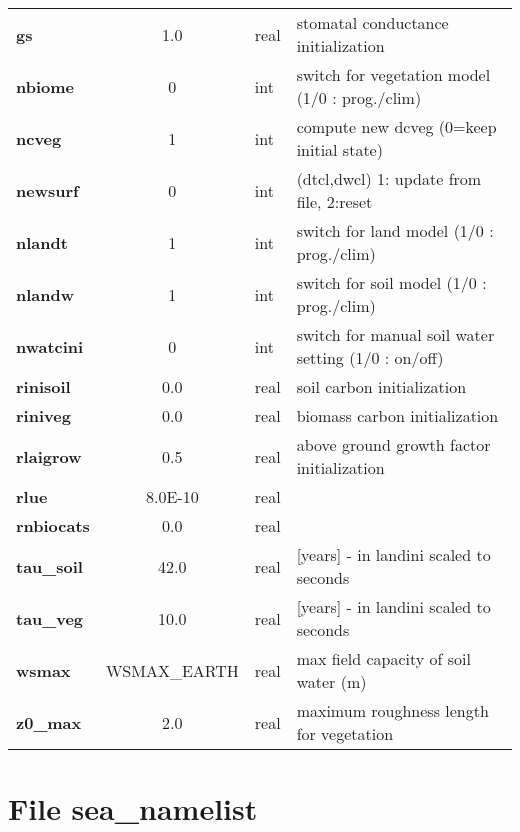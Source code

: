 \begin{tabular}{|l|c|l|l|}
{\bf  gs       } & 1.0   & real & stomatal conductance initialization \\
{\bf  nbiome   } & 0     &  int & switch for vegetation model (1/0 : prog./clim) \\
{\bf  ncveg    } & 1     &  int & compute new dcveg (0=keep initial state) \\
{\bf  newsurf  } & 0     &  int & (dtcl,dwcl) 1: update from file, 2:reset  \\
{\bf  nlandt   } & 1     &  int & switch for land model (1/0 : prog./clim) \\
{\bf  nlandw   } & 1     &  int & switch for soil model (1/0 : prog./clim) \\
{\bf  nwatcini } & 0     &  int & switch for manual soil water setting (1/0 : on/off) \\
{\bf  rinisoil } &  0.0  & real & soil carbon initialization  \\
{\bf  riniveg  } &  0.0  & real & biomass carbon initialization \\
{\bf  rlaigrow } & 0.5   & real & above ground growth factor initialization \\
{\bf  rlue     } &  8.0E-10 & real & \\
{\bf  rnbiocats} &  0.0     & real & \\
{\bf  tau\_soil } & 42.0  & real & [years] - in landini scaled to seconds \\
{\bf  tau\_veg  } & 10.0  & real & [years] - in landini scaled to seconds \\
{\bf  wsmax    } & WSMAX\_EARTH & real & max field capacity of soil water (m) \\
{\bf  z0\_max   } & 2.0  &  real & maximum roughness length for vegetation \\
\hline                                                        
\end{tabular}


\section{File sea\_namelist}
